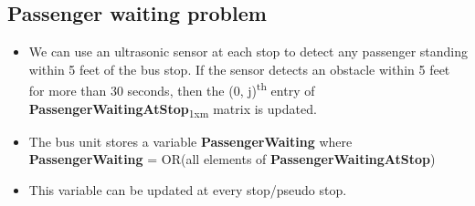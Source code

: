 \subsection{Passenger waiting problem}

\begin{itemize}

\item We can use an ultrasonic sensor at each stop to detect any passenger standing within 5 feet of the bus stop. If the sensor detects an obstacle within 5 feet for more than 30 seconds, then the (0, j)\textsuperscript{th} entry of \textbf{PassengerWaitingAtStop}\textsubscript{1xm} matrix is updated.
\item The bus unit stores a variable \textbf{PassengerWaiting} where\\
\textbf{PassengerWaiting} = OR(all elements of \textbf{PassengerWaitingAtStop})
\item This variable can be updated at every stop/pseudo stop.

\end{itemize}